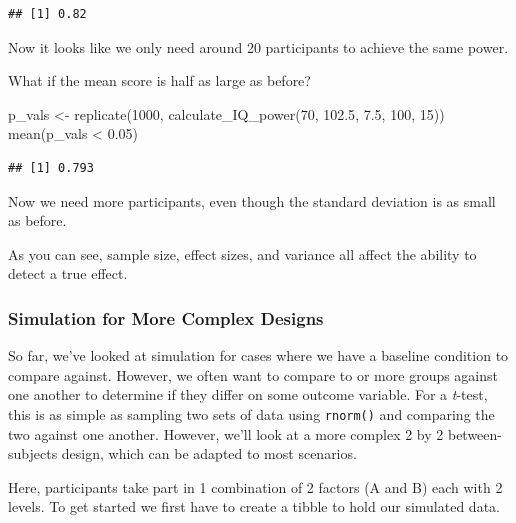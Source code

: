\documentclass[
]{book}
\newenvironment{Shaded}{\begin{snugshade}}{\end{snugshade}}
\newcommand{\DecValTok}[1]{\textcolor[rgb]{0.00,0.00,0.81}{#1}}
\newcommand{\FloatTok}[1]{\textcolor[rgb]{0.00,0.00,0.81}{#1}}
\newcommand{\FunctionTok}[1]{\textcolor[rgb]{0.00,0.00,0.00}{#1}}
\newcommand{\NormalTok}[1]{#1}
\newcommand{\OtherTok}[1]{\textcolor[rgb]{0.56,0.35,0.01}{#1}}
\newcommand{\SpecialCharTok}[1]{\textcolor[rgb]{0.00,0.00,0.00}{#1}}
\begin{document}
\begin{verbatim}
## [1] 0.82
\end{verbatim}

Now it looks like we only need around 20 participants to achieve the same power.

What if the mean score is half as large as before?

\begin{Shaded}
\begin{Highlighting}[]
\NormalTok{p\_vals }\OtherTok{\textless{}{-}} \FunctionTok{replicate}\NormalTok{(}\DecValTok{1000}\NormalTok{, }\FunctionTok{calculate\_IQ\_power}\NormalTok{(}\DecValTok{70}\NormalTok{, }\FloatTok{102.5}\NormalTok{, }\FloatTok{7.5}\NormalTok{, }\DecValTok{100}\NormalTok{, }\DecValTok{15}\NormalTok{))}
\FunctionTok{mean}\NormalTok{(p\_vals }\SpecialCharTok{\textless{}} \FloatTok{0.05}\NormalTok{)}
\end{Highlighting}
\end{Shaded}

\begin{verbatim}
## [1] 0.793
\end{verbatim}

Now we need more participants, even though the standard deviation is as small as before.

As you can see, sample size, effect sizes, and variance all affect the ability to detect a true effect.

\hypertarget{simulation-for-more-complex-designs}{%
\subsubsection{Simulation for More Complex Designs}\label{simulation-for-more-complex-designs}}

So far, we've looked at simulation for cases where we have a baseline condition to compare against. However, we often want to compare to or more groups against one another to determine if they differ on some outcome variable. For a \emph{t}-test, this is as simple as sampling two sets of data using \texttt{rnorm()} and comparing the two against one another. However, we'll look at a more complex 2 by 2 between-subjects design, which can be adapted to most scenarios.

Here, participants take part in 1 combination of 2 factors (A and B) each with 2 levels. To get started we first have to create a tibble to hold our simulated data.
\end{document}
